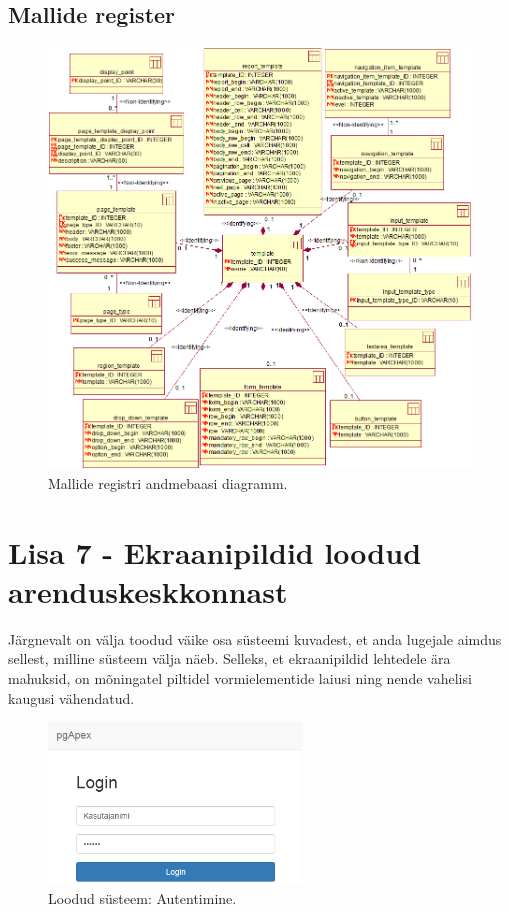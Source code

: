 \documentclass[a4paper,12pt]{article} %
\begin{document}
\subsection*{Mallide register}
\begin{figure}[H]
\centering
\includegraphics[width=\textwidth]{./diagrams/template-db-diagram.png}
\caption{Mallide registri andmebaasi diagramm.}
\label{fig_mallide_registri_andmebaasi_diagramm}
\end{figure}

\pagebreak

\section*{Lisa 7 - Ekraanipildid loodud arenduskeskkonnast}
\label{lisa_kasutajaliidese_ekraanipildid}
Järgnevalt on välja toodud väike osa süsteemi kuvadest, et anda lugejale aimdus sellest, milline süsteem välja näeb.
Selleks, et ekraanipildid lehtedele ära mahuksid, on mõningatel piltidel vormielementide laiusi ning nende vahelisi kaugusi vähendatud.

\begin{figure}[H]
\centering
\includegraphics[width=0.6\textwidth]{./diagrams/pgapex-login.png}
\caption{Loodud süsteem: Autentimine.}
\label{fig_loodud_süsteem_autentimine}
\end{figure}
\end{document}
